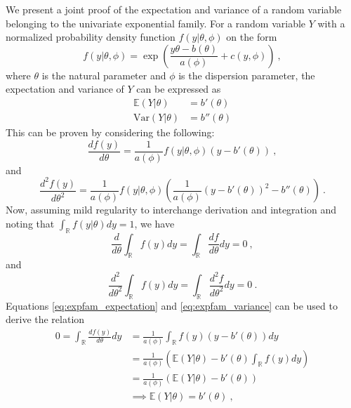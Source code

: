We present a joint proof of the expectation and variance of a random variable belonging to the univariate exponential family.
For a random variable $Y$ with a normalized probability density function $f(y \lvert \theta, \phi)$ on the form
\begin{equation}
    f(y \lvert \theta, \phi) = \exp\left( \frac{y\theta - b(\theta)}{a(\phi)} + c(y, \phi) \right) \ ,
\end{equation}
where $\theta$ is the natural parameter and $\phi$ is the dispersion parameter, the expectation and variance of $Y$ can be expressed as
\begin{equation}
    \begin{aligned}
        \mathbb{E}(Y \lvert \theta) &= b'(\theta) \\
        \text{Var}(Y \lvert \theta) &= b''(\theta)
    \end{aligned}
\end{equation}
This can be proven by considering the following:
\begin{equation}
    \frac{d f(y)}{d\theta} = \frac{1}{a(\phi)} f(y \lvert \theta, \phi) (y-b'(\theta))  \ ,
\end{equation}
and 
\begin{equation}
    \frac{d^2 f(y)}{d\theta^2} = \frac{1}{a(\phi)}f(y \lvert \theta, \phi) \left( \frac{1}{a(\phi)}(y-b'(\theta))^2 - b''(\theta) \right) \ .
\end{equation}
Now, assuming mild regularity to interchange derivation and integration and noting that  $\int_{\mathbb{R}} f(y \lvert \theta) dy = 1$, we have 
\begin{equation}
    \label{eq:expfam_expectation}
    \frac{d}{d \theta} \int_{\mathbb{R}} f(y) dy  = \int_{\mathbb{R}} \frac{d f}{d\theta} dy = 0 \ ,
\end{equation}
and 
\begin{equation}
    \label{eq:expfam_variance}
    \frac{d^2}{d \theta^2} \int_{\mathbb{R}} f(y) dy = \int_{\mathbb{R}} \frac{d^2 f}{d\theta^2} dy = 0 \ .
\end{equation}
Equations \eqref{eq:expfam_expectation} and \eqref{eq:expfam_variance} can be used to derive the relation 
\begin{equation}
    \begin{aligned}
    0 = \int_{\mathbb{R}} \frac{d f(y)}{d\theta} dy &= \frac{1}{a(\phi)}\int_{\mathbb{R}} f(y) (y-b'(\theta)) dy \\
    & = \frac{1}{a(\phi)} \left(\mathbb{E}(Y \lvert \theta) - b'(\theta)\int_{\mathbb{R}}f(y)dy \right) \\
    & = \frac{1}{a(\phi)} \left( \mathbb{E}(Y \lvert \theta) - b'(\theta) \right) \\
    & \implies \mathbb{E}(Y \lvert \theta) = b'(\theta) \ ,
    \end{aligned}
\end{equation}

